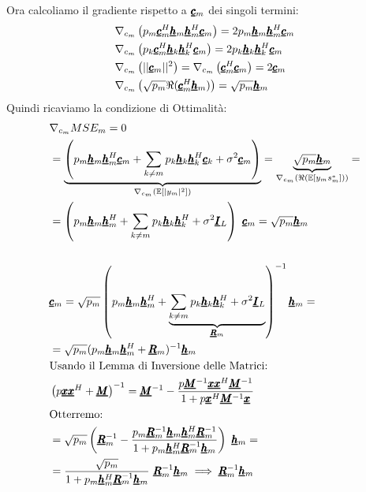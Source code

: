Ora calcoliamo il gradiente rispetto a $\vc{c}_m$ dei singoli termini:
\begin{equation*}
    \begin{aligned}
    &\nabla_{c_{m}}\left(p_m \vc{c}_m^H \vc{h}_m \vc{h}_m^H \vc{c}_m\right) = 2p_m\vc{h}_m \vc{h}_m^H\vc{c}_m \\
    &\nabla_{c_{m}} \left(p_k \vc{c}_m^H \vc{h}_k \vc{h}_k^H \vc{c}_m\right) = 2p_k\vc{h}_k \vc{h}_k^H\vc{c}_m \\
    &\nabla_{c_{m}} \left(||\vc{c}_m||^2\right) = \nabla_{c_{m}} \left(\vc{c}_m^H \vc{c}_m\right) = 2\vc{c}_m \\
    &\nabla_{c_{m}} \left(\sqrt{p_m} \Re{(\vc{c}_m^H \vc{h}_m)}\right) = \sqrt{p_m}\vc{h}_m
    \end{aligned}
\end{equation*}
Quindi ricaviamo la condizione di Ottimalità:
\begin{equation*}
    \begin{aligned}
    &\nabla_{c_{m}} MSE_m = 0 \\
    &= \underbrace{\left(p_m\vc{h}_m \vc{h}_m^H\vc{c}_m + \sum_{k \neq m} p_k\vc{h}_k \vc{h}_k^H\vc{c}_k + \sigma^2\vc{c}_m \right)}_{\nabla_{c_{m}} \left(\av{|y_m|^2}\right)} = \underbrace{\sqrt{p_m}\vc{h}_m}_{\nabla_{c_{m}} \left(\Re{\left(\av{y_m s_m^*} \right)}\right)} = \\
    &= \left(p_m\vc{h}_m \vc{h}_m^H + \sum_{k \neq m} p_k\vc{h}_k \vc{h}_k^H + \sigma^2\vc{I}_L \right) \ \vc{c}_m = \sqrt{p_m}\vc{h}_m \\ \\
    & \vc{c}_m = \sqrt{p_m} \left(p_m\vc{h}_m \vc{h}_m^H + \underbrace{\sum_{k \neq m} p_k\vc{h}_k \vc{h}_k^H + \sigma^2\vc{I}_L}_{\vc{R}_m} \right)^{-1} \vc{h}_m = \\
    &= \sqrt{p_m} (p_m\vc{h}_m \vc{h}_m^H + \vc{R}_m)^{-1} \vc{h}_m  \\
    &\text{Usando il Lemma di Inversione delle Matrici:} \\
    & \left(p\vc{x}\vc{x}^H + \vc{M} \right)^{-1} = \vc{M}^{-1} - \frac{p\vc{M}^{-1} \vc{x} \vc{x}^H \vc{M}^{-1}}{1 + p\vc{x}^H \vc{M}^{-1}\vc{x}} \\
    &\text{Otterremo:} \\
    &= \sqrt{p_m} \left(\vc{R}_m^{-1} - \frac{p_m \vc{R}_m^{-1} \vc{h}_m \vc{h}_m^H \vc{R}_m^{-1}}{1 + p_m \vc{h}_m^H \vc{R}_m^{-1} \vc{h}_m} \right) \ \vc{h}_m = \\
    &= \frac{\sqrt{p_m}}{1 + p_m \vc{h}_m^H \vc{R}_m^{-1} \vc{h}_m} \ \vc{R}_m^{-1} \vc{h}_m \implies \vc{R}_m^{-1} \vc{h}_m
    \end{aligned}
\end{equation*}

